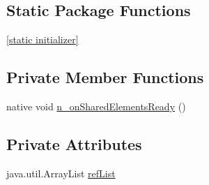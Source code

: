 \subsection*{Static Package Functions}
\begin{CompactItemize}
\item 
\hyperlink{classmono_1_1android_1_1support_1_1v4_1_1app_1_1_shared_element_callback___on_shared_elements_ready_listener_implementor_9c3979fa6303774471c12f67707d5656}{\mbox{[}static initializer\mbox{]}}
\end{CompactItemize}
\subsection*{Private Member Functions}
\begin{CompactItemize}
\item 
native void \hyperlink{classmono_1_1android_1_1support_1_1v4_1_1app_1_1_shared_element_callback___on_shared_elements_ready_listener_implementor_b0353b4761acae321902955e306a668c}{n\_\-onSharedElementsReady} ()
\end{CompactItemize}
\subsection*{Private Attributes}
\begin{CompactItemize}
\item 
java.util.ArrayList \hyperlink{classmono_1_1android_1_1support_1_1v4_1_1app_1_1_shared_element_callback___on_shared_elements_ready_listener_implementor_ae31653e3845f37f3a15997b7034f497}{refList}
\end{CompactItemize}


